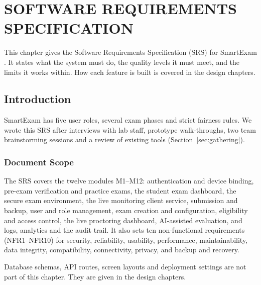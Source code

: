 \chapter{SOFTWARE REQUIREMENTS SPECIFICATION}
\label{chap:srs}

This chapter gives the Software Requirements Specification (SRS) for SmartExam \cite{srs1}. It states what the system must do, the quality levels it must meet, and the limits it works within. How each feature is built is covered in the design chapters.

\section{Introduction}
SmartExam has five user roles, several exam phases and strict fairness rules. We wrote this SRS after interviews with lab staff, prototype walk-throughs, two team brainstorming sessions and a review of existing tools (Section~\ref{sec:gathering}).

\subsection{Document Scope}
The SRS covers the twelve modules M1--M12: authentication and device binding, pre-exam verification and practice exams, the student exam dashboard, the secure exam environment, the live monitoring client service, submission and backup, user and role management, exam creation and configuration, eligibility and access control, the live proctoring dashboard, AI-assisted evaluation, and logs, analytics and the audit trail. It also sets ten non-functional requirements (NFR1--NFR10) for security, reliability, usability, performance, maintainability, data integrity, compatibility, connectivity, privacy, and backup and recovery.

Database schemas, API routes, screen layouts and deployment settings are not part of this chapter. They are given in the design chapters.

